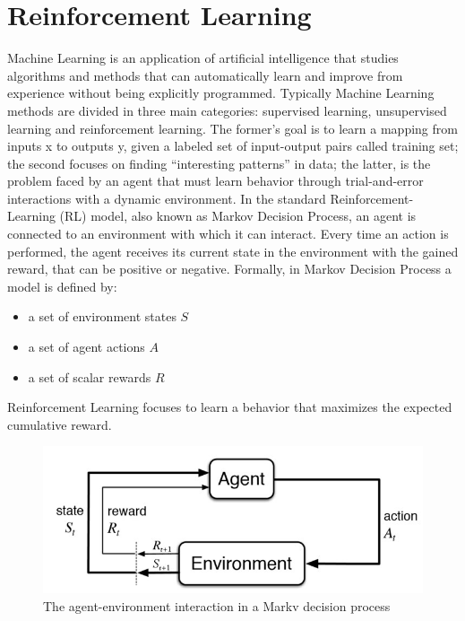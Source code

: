 \documentclass[Lau,oneside,noexaminfo]{sapthesis} %
\begin{document}
\chapter{Reinforcement Learning}
Machine Learning is an application of artificial intelligence that studies algorithms and methods that can automatically learn and improve from experience without being explicitly programmed. \newline
Typically Machine Learning methods are divided in three main categories: supervised learning, unsupervised learning and reinforcement learning. \newline
The former’s goal is to learn a mapping from inputs x to outputs y, given a labeled set of input-output pairs called training set; the second focuses on finding “interesting patterns” in data; \cite{MURPHY} the latter, is the problem faced by an agent that must learn behavior through trial-and-error interactions with a dynamic environment. \newline
In the standard Reinforcement-Learning (RL) model, also known as Markov Decision Process, an agent is connected to an environment with which it can interact. Every time an action is performed, the agent receives its current state in the environment with the gained reward, that can be positive or negative. \newline
Formally, in Markov Decision Process a model is defined by:
\begin{itemize}
  \item a set of environment states $S$
  \item a set of agent actions $A$
  \item a set of scalar rewards $R$
\end{itemize}
Reinforcement Learning focuses to learn a behavior that maximizes the expected cumulative reward. \cite{RLSURVEY} \newline
\begin{figure}[H]
\caption{The agent-environment interaction in a Markv decision process}
\centering
\includegraphics[width=\textwidth]{markov}
\end{figure}
\end{document}
